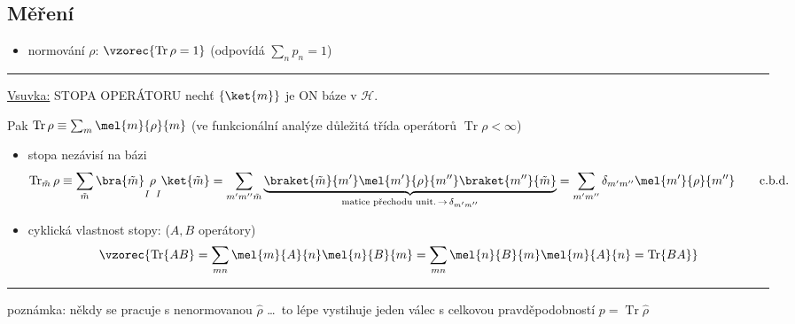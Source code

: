 \subsection*{Měření}
\begin{itemize}
  \item normování $\rho$: \quad $\vzorec{\operatorname{Tr}\rho = 1}$ \quad (odpovídá $\sum_n p_n = 1$) \\
\end{itemize}

\noindent\rule{\linewidth}{0.4pt}

\underline{Vsuvka:} \quad STOPA OPERÁTORU \quad nechť $\{\ket{m}\}$ je ON báze v $\mathcal{H}$.

\begin{definice}
Pak \quad $\operatorname{Tr}\rho \equiv \sum_m\mel{m}{\rho}{m}$ \hfill (ve funkcionální analýze důležitá třída operátorů $\operatorname{Tr}\rho < \infty$)
\end{definice}

\begin{itemize}[label=--]
  \item stopa nezávisí na bázi
  \[
    \operatorname{Tr}_{\tilde m}\rho \equiv \sum_{\tilde m}\bra{\tilde m}\underset{I}{\vphantom{\big|}}\rho\underset{I}{\vphantom{\big|}}\ket{\tilde m}
    = \sum_{m'm''\tilde m}\underbrace{\braket{\tilde m}{m'}\mel{m'}{\rho}{m''}\braket{m''}{\tilde m}}_{\text{matice přechodu unit.} \,\to\, \delta_{m'm''}}
    = \sum_{m'm''}\delta_{m'm''}\mel{m'}{\rho}{m''} \qquad\text{c.b.d.}
  \]
  \item cyklická vlastnost stopy: \quad ($A, B$ operátory)
  \[
    \vzorec{\operatorname{Tr}\{AB\} = \sum_{mn}\mel{m}{A}{n}\mel{n}{B}{m} = \sum_{mn}\mel{n}{B}{m}\mel{m}{A}{n} = \operatorname{Tr}\{BA\}}
  \]
\end{itemize}

\noindent\rule{\linewidth}{0.4pt}

poznámka: někdy se pracuje s nenormovanou $\hat\rho$ \dots\ to lépe vystihuje jeden válec s celkovou pravděpodobností $p = \operatorname{Tr}\hat\rho$

